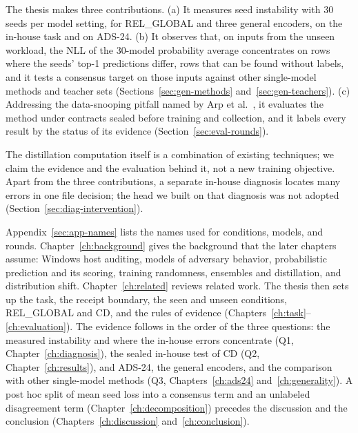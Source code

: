 The thesis makes three contributions. (a) It measures seed instability
with 30 seeds per model setting, for REL\_GLOBAL and three general
encoders, on the in-house task and on ADS-24. (b) It observes that, on
inputs from the unseen workload, the NLL of the 30-model probability
average concentrates on rows where the seeds' top-1 predictions differ,
rows that can be found without labels, and it tests a consensus target
on those inputs against other single-model methods and teacher sets
(Sections~\ref{sec:gen-methods} and~\ref{sec:gen-teachers}). (c) Addressing the
data-snooping pitfall named by Arp et al.~\cite{arp2020dos}, it
evaluates the method under contracts sealed before training and
collection, and it labels every result by the status of its evidence
(Section~\ref{sec:eval-rounds}).

The distillation computation itself is a combination of existing
techniques; we claim the evidence and the evaluation behind it, not a
new training objective. Apart from the three contributions, a separate
in-house diagnosis locates many errors in one file decision; the head
we built on that diagnosis was not adopted
(Section~\ref{sec:diag-intervention}).

Appendix~\ref{sec:app-names} lists the names used for conditions,
models, and rounds. Chapter~\ref{ch:background} gives the background
that the later chapters assume: Windows host auditing, models of adversary behavior,
probabilistic prediction and its scoring, training randomness,
ensembles and distillation, and distribution shift.
Chapter~\ref{ch:related} reviews related work. The thesis then sets up the task, the receipt boundary, the seen and unseen conditions,
REL\_GLOBAL and CD, and the rules of evidence
(Chapters~\ref{ch:task}--\ref{ch:evaluation}). The evidence follows in
the order of the three questions: the measured instability and where
the in-house errors concentrate (Q1, Chapter~\ref{ch:diagnosis}), the
sealed in-house test of CD (Q2, Chapter~\ref{ch:results}), and ADS-24,
the general encoders, and the comparison with other single-model
methods (Q3, Chapters~\ref{ch:ads24} and~\ref{ch:generality}). A post
hoc split of mean seed loss into a consensus term and an unlabeled
disagreement term (Chapter~\ref{ch:decomposition}) precedes the
discussion and the conclusion (Chapters~\ref{ch:discussion}
and~\ref{ch:conclusion}).
